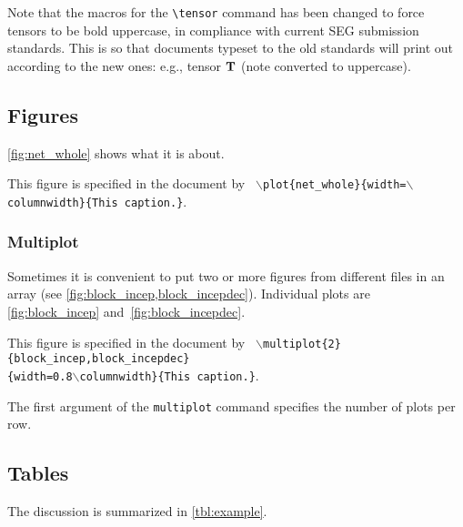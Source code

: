 \documentclass[wordlite,texlive,final]{segabs}
\begin{document}
Note that the macros for the \verb#\tensor# command has been changed
to force tensors to be bold uppercase, in compliance with current SEG
submission standards. This is so that documents typeset to the old
standards will print out according to the new ones: e.g., tensor
$\tensor{t}$ (note converted to uppercase).

\subsection*{Figures}
\renewcommand{\figdir}{Fig} %

\autoref{fig:net_whole} shows what it is about.

{This figure is specified in the document by \texttt{
    $\backslash$plot\{net\_whole\}\{width=$\backslash$columnwidth\}\{This caption.\}}.
}

\subsubsection{Multiplot} 

Sometimes it is convenient to put two or
more figures from different files in an array (see
\autoref{fig:block_incep,block_incepdec}). Individual plots are
\autoref{fig:block_incep} and~\autoref{fig:block_incepdec}.

{This figure is specified in the document by \texttt{
    $\backslash$multiplot\{2\}\{block\_incep,block\_incepdec\}\\\{width=0.8$\backslash$columnwidth\}\{This caption.\}}.
}

The first argument of the \texttt{multiplot} command specifies the
number of plots per row.

\subsection{Tables}

The discussion is summarized in \autoref{tbl:example}.
\end{document}
